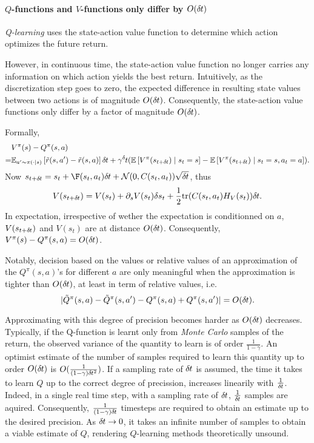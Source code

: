 
\paragraph{$Q$-functions and $V$-functions only differ by $O (\delta\hspace{-.06em}t)$}
\label{sec:QContinuous}
\emph{Q-learning} uses the state-action value function to determine which
action optimizes the future return.

However, in continuous time, the state-action value function no longer carries
any information on which action yields the best return. Intuitively, as the
discretization step goes to zero, the expected difference in resulting state
values between two actions is of magnitude $O (\delta\hspace{-.06em}t)$. Consequently, the
state-action value functions only differ by a factor of magnitude
$O (\delta\hspace{-.06em}t)$.

Formally,
\begin{align}
	&V^\pi(s) - Q^\pi(s, a)\\ 
	= &\BE_{a'\sim \pi(\cdot\mid s)}
	\left[\tilde{r}(s, a') - \tilde{r}(s, a)\right] \deltat
	+
	\gamma^\deltat 
	(\BE\left[V^\pi(s_{t+\deltat}) \mid s_t=s\right]
	-
	\BE\left[V^\pi(s_{t+\deltat}) \mid s_t=s, a_t=a\right]).\nonumber
\end{align}
Now $s_{t + \deltat} = s_t + \F(s_t, a_t) \deltat +
\gauss(0, C(s_t, a_t)) \sqrt{\deltat}$, thus 
\begin{equation}
	V(s_{t+\delta\hspace{-.06em}t}) = V(s_t) + \partial_s V(s_t) \delta s_t
	+ \frac{1}{2}\mathrm{tr}(C(s_t, a_t) H_V(s_t))\delta\hspace{-.06em}t.
\end{equation}
In expectation, irrespective of wether the expectation is conditionned on $a$,
$V(s_{t+\delta\hspace{-.06em}t})$ and $V(s_t)$ are at distance $O (\delta\hspace{-.06em}t)$. Consequently,
$V^\pi(s) - Q^\pi(s, a) = O (\delta\hspace{-.06em}t)$.

Notably, decision based on the values or relative values of an approximation of
the $Q^\pi(s, a)$'s for different $a$ are only meaningful when the
approximation is tighter than $O (\delta\hspace{-.06em}t)$, at least in term of relative
values, i.e.  
\begin{equation*}
	|\tilde{Q}^\pi(s, a) - \tilde{Q}^\pi(s, a') - Q^\pi(s, a) +
	Q^\pi(s, a')| = O (\delta\hspace{-.06em}t).
\end{equation*}

Approximating with this degree of precision becomes harder as $O (\delta\hspace{-.06em}t)$
decreases. Typically, if the Q-function is learnt only from \emph{Monte Carlo} samples
of the return, the observed variance of the quantity to learn is of order
$\frac{1}{1 - \gamma}$. An optimist estimate of the number of
samples required to learn this quantity up to order $O (\delta\hspace{-.06em}t)$ is 
$O (\frac{1}{(1 - \gamma) \delta\hspace{-.06em}t^2})$. If a sampling rate of $\delta\hspace{-.06em}t$ is
assumed, the time it takes to learn $Q$ up to the correct degree of precission,
increases linearily with $\frac{1}{\delta\hspace{-.06em}t}$. Indeed, in a single real time step, with a
sampling rate of $\delta\hspace{-.06em}t$, $\frac{1}{\delta\hspace{-.06em}t}$ samples are aquired. Consequently,
$\frac{1}{(1 - \gamma) \delta\hspace{-.06em}t}$ timesteps are required to obtain an estimate up
to the desired precision. As $\delta\hspace{-.06em}t \to 0$, it takes an infinite number of samples
to obtain a viable estimate of $Q$, rendering $Q$-learning methods theoretically
unsound.

